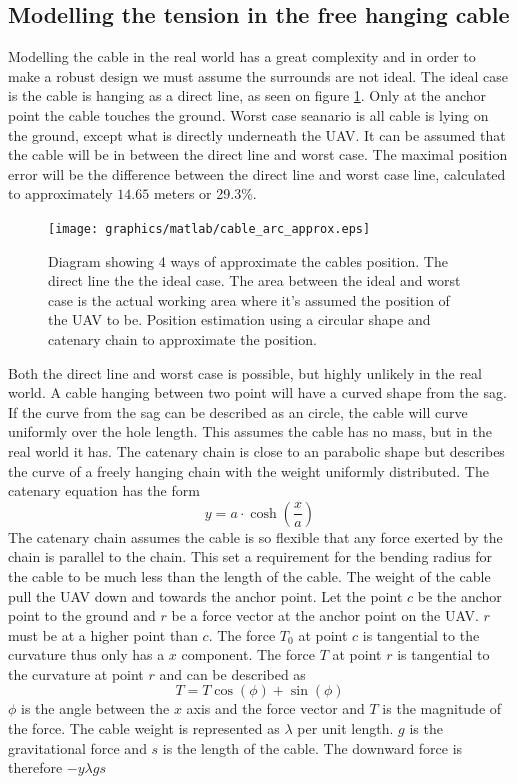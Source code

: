 \subsection{Modelling the tension in the free hanging cable}
Modelling the cable in the real world has a great complexity and in order to make a robust design we must assume the surrounds are not ideal. The ideal case is the cable is hanging as a direct line, as seen on figure \ref{fig:cable_model_cases}. Only at the anchor point the cable touches the ground. Worst case seanario is all cable is lying on the ground, except what is directly underneath the UAV. It can be assumed that the cable will be in between the direct line and worst case. The maximal position error will be the difference between the direct line and worst case line, calculated to approximately $14.65$ meters or 29.3\%. 

\begin{figure}[H]
\centering
\texttt{[image: graphics/matlab/cable\_arc\_approx.eps]}
\caption{Diagram showing 4 ways of approximate the cables position. The direct line the the ideal case. The area between the ideal and worst case is the actual working area where it's assumed the position of the UAV to be. Position estimation using a circular shape and catenary chain to approximate the position.}
\label{fig:cable_model_cases}
\end{figure}

\noindent
Both the direct line and worst case is possible, but highly unlikely in the real world. A cable hanging between two point will have a curved shape from the sag. If the curve from the sag can be described as an circle, the cable will curve uniformly over the hole length. This assumes the cable has no mass, but in the real world it has.
The catenary chain is close to an parabolic shape but describes the curve of a freely hanging chain with the weight uniformly distributed\cite{Whewelll1833}. The catenary equation has the form
\begin{equation}
y = a \cdot \cosh\left(\frac{x}{a}\right)
\end{equation}
The catenary chain assumes the cable is so flexible that any force exerted by the chain is parallel to the chain. This set a requirement for the bending radius for the cable to be much less than the length of the cable.
The weight of the cable pull the UAV down and towards the anchor point. Let the point $c$ be the anchor point to the ground and $r$ be a force vector at the anchor point on the UAV. $r$ must be at a higher point than $c$. The force $T_0$ at point $c$ is tangential to the curvature thus only has a $x$ component. The force $T$ at point $r$ is tangential to the curvature at point $r$ and can be described as
\begin{equation}
T = T \cos(\phi) +  \sin(\phi)
\end{equation} 
$\phi$ is the angle between the $x$ axis and the force vector and $T$ is the magnitude of the force. The cable weight is represented as $\lambda$ per unit length. $g$ is the gravitational force and $s$ is the length of the cable. The downward force is therefore $-y \lambda g s$

